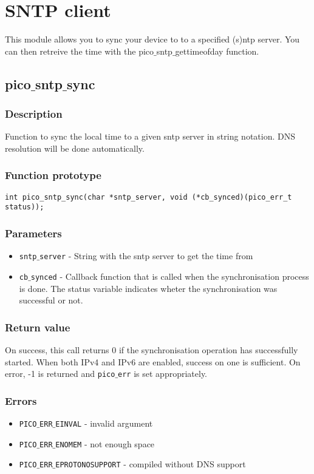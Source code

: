 \section{SNTP client}

This module allows you to sync your device to to a specified (s)ntp server.
You can then retreive the time with the pico$\_$sntp$\_$gettimeofday function.


\subsection{pico$\_$sntp$\_$sync}

\subsubsection*{Description}
Function to sync the local time to a given sntp server in string notation. DNS resolution will be done automatically.
\subsubsection*{Function prototype}
\begin{verbatim}
int pico_sntp_sync(char *sntp_server, void (*cb_synced)(pico_err_t status));
\end{verbatim}

\subsubsection*{Parameters}
\begin{itemize}[noitemsep]
\item \texttt{sntp$\_$server} - String with the sntp server to get the time from
\item \texttt{cb$\_$synced} - Callback function that is called when the synchronisation process is done. The status variable indicates wheter the synchronisation was successful or not.
\end{itemize}

\subsubsection*{Return value}
On success, this call returns 0 if the synchronisation operation has successfully started. When both IPv4 and IPv6 are enabled, success on one is sufficient.
On error, -1 is returned and \texttt{pico$\_$err} is set appropriately.

\subsubsection*{Errors}
\begin{itemize}[noitemsep]
\item \texttt{PICO$\_$ERR$\_$EINVAL} - invalid argument
\item \texttt{PICO$\_$ERR$\_$ENOMEM} - not enough space
\item \texttt{PICO$\_$ERR$\_$EPROTONOSUPPORT} - compiled without DNS support
\end{itemize}

